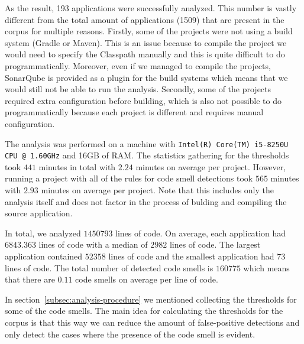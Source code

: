 

As the result, 193 applications were successfully analyzed.
This number is vastly different from the total amount of applications (1509) that are present in the corpus for multiple reasons.
Firstly, some of the projects were not using a build system (Gradle or Maven).
This is an issue because to compile the project we would need to specify the Classpath manually and
this is quite difficult to do programmatically.
Moreover, even if we managed to compile the projects, SonarQube is provided as a plugin for the build systems which means
that we would still not be able to run the analysis.
Secondly, some of the projects required extra configuration before building, which is also not possible to do
programmatically because each project is different and requires manual configuration.

The analysis was performed on a machine with \verb|Intel(R) Core(TM) i5-8250U CPU @ 1.60GHz| and 16GB of RAM\@.
The statistics gathering for the thresholds took $441$ minutes in total with $2.24$ minutes on average per project.
However, running a project with all of the rules for code smell detections took $565$ minutes with $2.93$ minutes on average per project.
Note that this includes only the analysis itself and does not factor in the process of bulding and compiling the source
application.

In total, we analyzed $1450793$ lines of code.
On average, each application had $6843.363$ lines of code with a median of $2982$ lines of code.
The largest application contained $52358$ lines of code and the smallest application had $73$ lines of code.
The total number of detected code smells is $160775$ which means that there are $0.11$ code smells on average per line of code.


In section~\ref{subsec:analysis-procedure} we mentioned collecting the thresholds for some of the code smells.
The main idea for calculating the thresholds for the corpus is that this way we can reduce
the amount of false-positive detections and only detect the cases where the presence of the code smell is evident.

